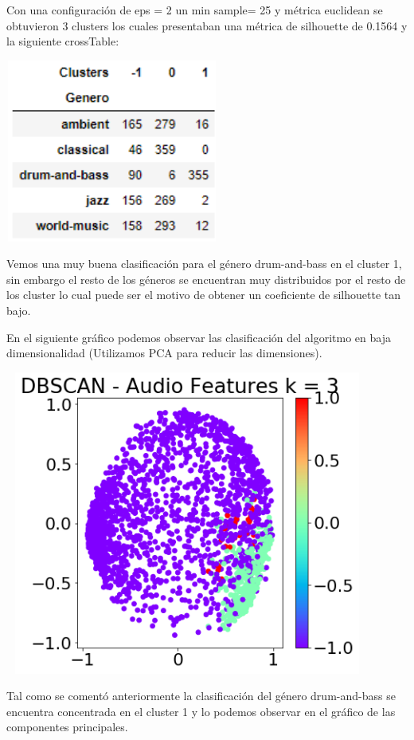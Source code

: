 \documentclass{icisfinal}
\begin{document}
Con una configuración de eps = 2 un min sample= 25 y métrica euclidean se obtuvieron 3 clusters los cuales presentaban una métrica de silhouette de 0.1564 y la siguiente crossTable:

\includegraphics[width=7cm, height=6cm]{img/imagenes/8DBSCAN_ct.PNG}

Vemos una muy buena clasificación para el género drum-and-bass en el cluster 1, sin embargo el resto de los géneros se encuentran muy distribuidos por el resto de los cluster lo cual puede ser el motivo de obtener un coeficiente de silhouette tan bajo.

En el siguiente gráfico podemos observar las clasificación del algoritmo en baja dimensionalidad (Utilizamos PCA para reducir las dimensiones).

\includegraphics[width=12cm, height=10cm]{img/imagenes/9DBSCAN_pca}

Tal como se comentó anteriormente la clasificación del género drum-and-bass se encuentra concentrada en el cluster 1 y lo podemos observar en el gráfico de las componentes principales.
\end{document}
